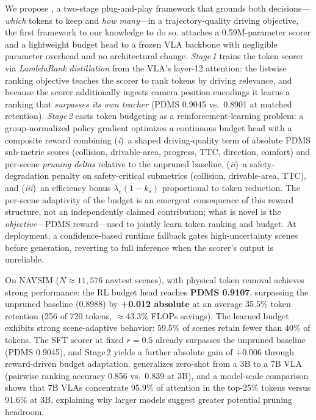 \documentclass[letterpaper]{article} %
\begin{document}
We propose \ours{}, a two-stage plug-and-play framework that grounds both
decisions---\emph{which} tokens to keep and \emph{how many}---in a trajectory-quality driving objective, the first framework to our knowledge to do so.
\ours{} attaches a 0.59M-parameter scorer and a lightweight budget head to a frozen VLA
backbone with negligible parameter overhead and no architectural change.
\emph{Stage\,1} trains the token scorer via \emph{LambdaRank distillation}
from the VLA's layer-12 attention: the listwise ranking objective teaches the
scorer to rank tokens by driving relevance, and because the scorer additionally
ingests camera position encodings it learns a ranking that \emph{surpasses its
own teacher} (PDMS 0.9045 vs.\ 0.8901 at matched retention).
\emph{Stage\,2} casts token budgeting as a reinforcement-learning problem: a
group-normalized policy gradient optimizes a continuous budget head with a composite
reward combining (\textit{i})~a shaped driving-quality term of absolute PDMS
sub-metric scores (collision, drivable-area, progress, TTC, direction, comfort)
and per-scene \emph{pruning deltas} relative to the unpruned baseline,
(\textit{ii})~a safety-degradation penalty on safety-critical submetrics
(collision, drivable-area, TTC), and (\textit{iii})~an efficiency bonus
$\lambda_{e}(1{-}k_s)$ proportional to token reduction.
The per-scene adaptivity of the budget is an emergent consequence of this reward
structure, not an independently claimed contribution; what is novel is the
\emph{objective}---PDMS reward---used to jointly learn token ranking and budget.
At deployment, a confidence-based runtime fallback gates high-uncertainty scenes
before generation, reverting to full inference when the scorer's output is
unreliable.

On NAVSIM ($N{\approx}11{,}576$ navtest scenes), \ours{} with physical token removal
achieves strong performance: the RL budget head reaches \textbf{PDMS 0.9107},
surpassing the unpruned baseline (0.8988) by \textbf{+0.012 absolute} at an
average 35.5\% token retention (256 of 720 tokens, ${\approx}43.3\%$ FLOPs
savings).
The learned budget exhibits strong scene-adaptive behavior: 59.5\% of scenes retain
fewer than 40\% of tokens.
The SFT scorer at fixed $r{=}0.5$ already surpasses the unpruned baseline
(PDMS 0.9045), and Stage\,2 yields a further absolute gain of $+0.006$ through
reward-driven budget adaptation.
\ours{} generalizes zero-shot from a 3B to a 7B VLA (pairwise ranking accuracy
0.856 vs.\ 0.839 at 3B), and a model-scale comparison shows that 7B VLAs concentrate
95.9\% of attention in the top-25\% tokens versus 91.6\% at 3B, explaining why
larger models suggest greater potential pruning headroom.
\end{document}
